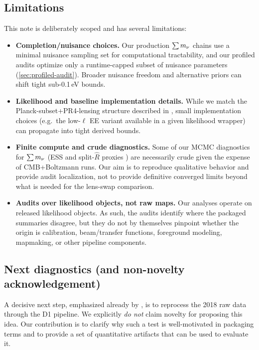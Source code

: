 \subsection{Limitations}
This note is deliberately scoped and has several limitations:
\begin{itemize}[leftmargin=*, itemsep=2pt]
  \item \textbf{Completion/nuisance choices.} Our production $\sum m_\nu$ chains use a minimal nuisance sampling set for computational tractability, and our profiled audits optimize only a runtime-capped subset of nuisance parameters (\cref{sec:profiled-audit}). Broader nuisance freedom and alternative priors can shift tight sub-0.1\,eV bounds.
  \item \textbf{Likelihood and baseline implementation details.} While we match the Planck-subset+PR4-lensing structure described in \cite{arxiv2601_16277}, small implementation choices (e.g.\ the low-$\ell$ EE variant available in a given likelihood wrapper) can propagate into tight derived bounds.
  \item \textbf{Finite compute and crude diagnostics.} Some of our MCMC diagnostics for $\sum m_\nu$ (ESS and split-$\hat R$ proxies \cite{gelman_rubin1992,vehtari2021_rhat}) are necessarily crude given the expense of CMB+Boltzmann runs. Our aim is to reproduce qualitative behavior and provide audit localization, not to provide definitive converged limits beyond what is needed for the lens-swap comparison.
  \item \textbf{Audits over likelihood objects, not raw maps.} Our analyses operate on released likelihood objects. As such, the audits identify where the packaged summaries disagree, but they do not by themselves pinpoint whether the origin is calibration, beam/transfer functions, foreground modeling, mapmaking, or other pipeline components.
\end{itemize}

\subsection{Next diagnostics (and non-novelty acknowledgement)}
A decisive next step, emphasized already by \cite{arxiv2601_16277}, is to reprocess the 2018 raw data through the D1 pipeline. We explicitly \emph{do not} claim novelty for proposing this idea. Our contribution is to clarify why such a test is well-motivated in packaging terms and to provide a set of quantitative artifacts that can be used to evaluate it.

